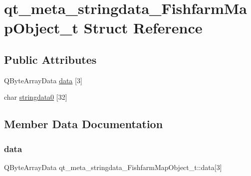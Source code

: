 \hypertarget{structqt__meta__stringdata___fishfarm_map_object__t}{}\section{qt\+\_\+meta\+\_\+stringdata\+\_\+\+Fishfarm\+Map\+Object\+\_\+t Struct Reference}
\label{structqt__meta__stringdata___fishfarm_map_object__t}
\subsection*{Public Attributes}
\begin{DoxyCompactItemize}
\item 
Q\+Byte\+Array\+Data \mbox{\hyperlink{structqt__meta__stringdata___fishfarm_map_object__t_a19f6e0d07dc55f873e2ffeee1dd3ff74}{data}} \mbox{[}3\mbox{]}
\item 
char \mbox{\hyperlink{structqt__meta__stringdata___fishfarm_map_object__t_afd323da0b476c8f3c42ed3c3881dc4c2}{stringdata0}} \mbox{[}32\mbox{]}
\end{DoxyCompactItemize}


\subsection{Member Data Documentation}
\mbox{\label{structqt__meta__stringdata___fishfarm_map_object__t_a19f6e0d07dc55f873e2ffeee1dd3ff74}} 
\subsubsection{\texorpdfstring{data}{data}}
{\footnotesize\ttfamily Q\+Byte\+Array\+Data qt\+\_\+meta\+\_\+stringdata\+\_\+\+Fishfarm\+Map\+Object\+\_\+t\+::data\mbox{[}3\mbox{]}}

\mbox{\label{structqt__meta__stringdata___fishfarm_map_object__t_afd323da0b476c8f3c42ed3c3881dc4c2}} 
